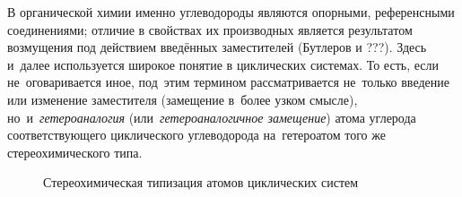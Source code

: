 В органической химии именно углеводороды являются опорными, референсными соединениями; отличие в свойствах их производных является результатом возмущения под действием введённых заместителей (Бутлеров и ???). Здесь и~далее используется широкое понятие  в циклических системах. То есть, если не~оговаривается иное, под~этим термином рассматривается не~только введение или изменение заместителя (замещение в~более узком смысле), но~и~\emph{гетероаналогия} (или~\emph{гетероаналогичное замещение}) атома углерода соответствующего циклического углеводорода на~гетероатом того же стереохимического типа. 

\begin{figure}
  \caption{Стереохимическая типизация атомов циклических систем\label{fig:Atom:Types}}
  
  \vspace{\bigskipamount}
\end{figure}
